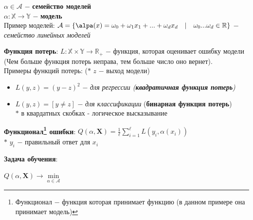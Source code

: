     \begin{definition}
        $\alpha \in \mathcal{A}$ $-$ \textbf{семейство моделей}\\
    $\alpha: \mathbb{X} \rightarrow \mathbb{Y}$ $-$ \textbf{модель}\\

    Пример моделей: $\mathcal{A} = \{\alpa(x) = \omega_0 + \omega_1x_1 + ... + \omega_dx_d \quad | \quad \omega_0 ... \omega_d \in \mathbb{R} \}$ $-$ \textit{семейство линейных моделей}\\
    \end{definition}
    

    \begin{definition}
        \textbf{Функция потерь}: $L : \mathbb{X} \times \mathbb{Y} \rightarrow \mathbb{R}_+$ $-$ функция, которая оценивает ошибку модели (Чем больше функция потерь неправа, тем больше число оно вернет).\\

        Примеры функций потерь:
        ($\ast$ $z$ $-$ выход модели)
        \begin{itemize}
            \item $L(y, z) = (y - z)^2$ $-$ \textit{для регрессии (\textbf{квадратичная функция потерь})}
    
            \item $L(y, z) = [y \neq z]$ $-$ \textit{для классификации} (\textbf{бинарная функция потерь})\\
            $\ast$ в квардатных скобках - логическое высказывание\\
    \end{itemize}
    \end{definition}
    

    \begin{definition}
        \textbf{Функционал\footnote{Функционал $-$ функция которая принимает функцию (в данном примере она принимает модель)} ошибки}: $Q(\alpha, \mathbf{X}) = \frac{1}{\ell} \sum\limits_{i=1}^\ell L(y_i, \alpha(x_i))$\\
        $\ast$ $y_i$ $-$ правильный ответ для $x_i$
    \end{definition}


    \begin{definition}
        \textbf{Задача обучения}:\\

        \begin{center}
            $Q(\alpha, \mathbf{X}) \longrightarrow \min\limits_{\alpha \in \mathcal{A}}$
        \end{center}
        
        
    \end{definition}

